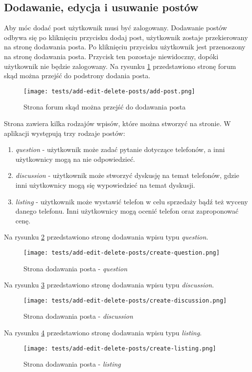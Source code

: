 \subsection{Dodawanie, edycja i usuwanie postów}
Aby móc dodać post użytkownik musi być zalogowany. Dodawanie postów odbywa się po kliknięciu przycisku dodaj post, użytkownik zostaje przekierowany na stronę dodawania posta. Po kliknięciu przycisku użytkownik jest przenoszony na stronę dodawania posta. Przycisk ten pozostaje niewidoczny, dopóki użytkownik nie będzie zalogowany. Na rysunku \ref{add_post} przedstawiono stronę forum skąd można przejść do podstrony dodania posta.
\begin{figure}[H]
  \centering
  \texttt{[image: tests/add-edit-delete-posts/add-post.png]}
  \caption{Strona forum skąd można przejść do dodawania posta}
  \label{add_post}
\end{figure}
Strona zawiera kilka rodzajów wpisów, które można stworzyć na stronie. W aplikacji występują trzy rodzaje postów: 
\begin{enumerate}
  \item \textit{question} - użytkownik może zadać pytanie dotyczące telefonów, a inni użytkownicy mogą na nie odpowiedzieć.
  \item \textit{discussion} - użytkownik może stworzyć dyskusję na temat telefonów, gdzie inni użytkownicy mogą się wypowiedzieć na temat dyskusji.
  \item \textit{listing} - użytkownik może wystawić telefon w celu sprzedaży bądź też wyceny danego telefonu. Inni użytkownicy mogą ocenić telefon oraz zaproponować cenę.
\end{enumerate}
Na rysunku \ref{add_question_page} przedstawiono stronę dodawania wpisu typu \textit{question}.
\begin{figure}[H]
  \centering
  \texttt{[image: tests/add-edit-delete-posts/create-question.png]}
  \caption{Strona dodawania posta - \textit{question}}
  \label{add_question_page}
\end{figure}
Na rysunku \ref{add_discussion_post} przedstawiono stronę dodawania wpisu typu \textit{discussion}.
\begin{figure}[H]
  \centering
  \texttt{[image: tests/add-edit-delete-posts/create-discussion.png]}
  \caption{Strona dodawania posta - \textit{discussion}}
  \label{add_discussion_post}
\end{figure}
Na rysunku \ref{add_listing_post} przedstawiono stronę dodawania wpisu typu \textit{listing}.
\begin{figure}[H]
  \centering
  \texttt{[image: tests/add-edit-delete-posts/create-listing.png]}
  \caption{Strona dodawania posta - \textit{listing}}
  \label{add_listing_post}
\end{figure}
